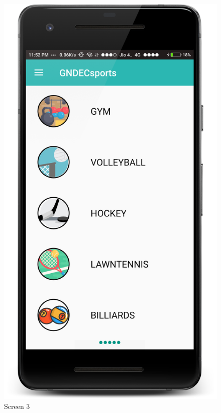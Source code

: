 \begin{figure}[ht]
\centering
\includegraphics[scale=0.13]{images/S3.png}
\caption{Screen 3}
\end{figure}

\newpage


